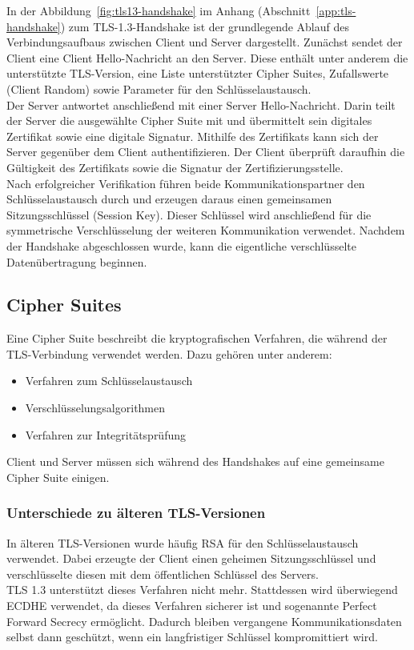 In der Abbildung~\ref{fig:tls13-handshake} im Anhang (Abschnitt~\ref{app:tls-handshake}) zum TLS-1.3-Handshake ist der grundlegende Ablauf des Verbindungsaufbaus zwischen Client und Server dargestellt. Zunächst sendet der Client eine Client Hello-Nachricht an den Server. Diese enthält unter anderem die unterstützte TLS-Version, eine Liste unterstützter Cipher Suites, Zufallswerte (Client Random) sowie Parameter für den Schlüsselaustausch. \\
Der Server antwortet anschließend mit einer Server Hello-Nachricht. Darin teilt der Server die ausgewählte Cipher Suite mit und übermittelt sein digitales Zertifikat sowie eine digitale Signatur. Mithilfe des Zertifikats kann sich der Server gegenüber dem Client authentifizieren. Der Client überprüft daraufhin die Gültigkeit des Zertifikats sowie die Signatur der Zertifizierungsstelle. \\
Nach erfolgreicher Verifikation führen beide Kommunikationspartner den Schlüsselaustausch durch und erzeugen daraus einen gemeinsamen Sitzungsschlüssel (Session Key). Dieser Schlüssel wird anschließend für die symmetrische Verschlüsselung der weiteren Kommunikation verwendet. Nachdem der Handshake abgeschlossen wurde, kann die eigentliche verschlüsselte Datenübertragung beginnen.


\subsection*{Cipher Suites}
Eine Cipher Suite beschreibt die kryptografischen Verfahren, die während der TLS-Verbindung verwendet werden. Dazu gehören unter anderem:
\begin{itemize}
  \item Verfahren zum Schlüsselaustausch
  \item Verschlüsselungsalgorithmen
  \item Verfahren zur Integritätsprüfung
\end{itemize}
Client und Server müssen sich während des Handshakes auf eine gemeinsame Cipher Suite einigen.

\subsubsection*{Unterschiede zu älteren TLS-Versionen}
In älteren TLS-Versionen wurde häufig RSA für den Schlüsselaustausch verwendet. Dabei erzeugte der Client einen geheimen Sitzungsschlüssel und verschlüsselte diesen mit dem öffentlichen Schlüssel des Servers. \\
TLS 1.3 unterstützt dieses Verfahren nicht mehr. Stattdessen wird überwiegend ECDHE verwendet, da dieses Verfahren sicherer ist und sogenannte Perfect Forward Secrecy ermöglicht. Dadurch bleiben vergangene Kommunikationsdaten selbst dann geschützt, wenn ein langfristiger Schlüssel kompromittiert wird.

